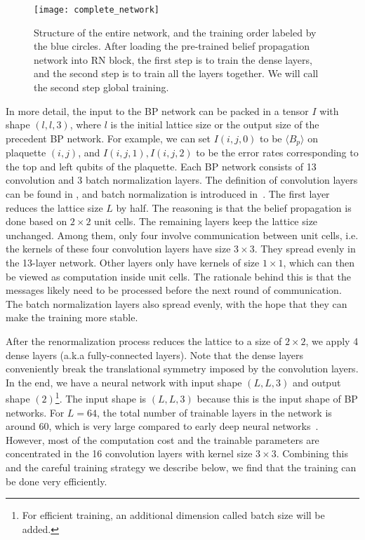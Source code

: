 \begin{figure}
	\texttt{[image: complete\_network]}
	\caption{Structure of the entire network, and the training order labeled by the blue circles. After loading the pre-trained belief propagation network into RN block, the first step is to train the dense layers, and the second step is to train all the layers together. We will call the second step global training.}
	\label{subfig:complete_network}

\end{figure}

In more detail, the input to the BP network can be packed in a tensor $I$ with shape $(l,l,3)$, where $l$ is the initial lattice size or the output size of the precedent BP network.
For example, we can set $I(i,j,0)$ to be $\langle B_p \rangle$ on plaquette $(i,j)$, and $I(i,j,1), I(i,j,2)$ to be the error rates corresponding to the top and left qubits of the plaquette.
Each BP network consists of 13 convolution and 3 batch normalization layers.
The definition of convolution layers can be found in , and batch normalization is introduced in~\cite{Ioffe2015BatchNormalization}.
The first layer reduces the lattice size $L$ by half.
The reasoning is that the belief propagation is done based on $2\times 2$ unit cells.
The remaining layers keep the lattice size unchanged.
Among them, only four involve communication between unit cells, i.e. the kernels of these four convolution layers have size $3\times 3$.
They spread evenly in the 13-layer network.
Other layers only have kernels of size $1\times 1$, which can then be viewed as computation inside unit cells.
The rationale behind this is that the messages likely need to be processed before the next round of communication.
The batch normalization layers also spread evenly, with the hope that they can make the training more stable.

After the renormalization process reduces the lattice to a size of $2\times 2$, we apply 4 dense layers (a.k.a fully-connected layers).
Note that the dense layers conveniently break the translational symmetry imposed by the convolution layers.
In the end, we have a neural network with input shape $(L,L,3)$ and output shape $(2)$\footnote{For efficient training, an additional dimension called batch size will be added.}.
The input shape is $(L,L,3)$ because this is the input shape of BP networks.
For $L=64$, the total number of trainable layers in the network is around 60, which is very large compared to early deep neural networks~\cite{Krizhevsky2012imagenet}.
However, most of the computation cost and the trainable parameters are concentrated in the 16 convolution layers with kernel size $3\times 3$.
Combining this and the careful training strategy we describe below, we find that the training can be done very efficiently.

